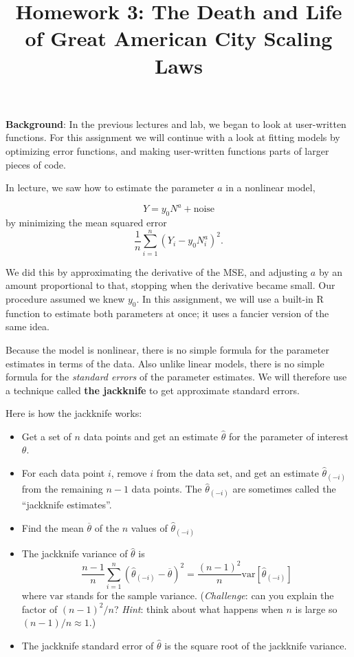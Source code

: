 \documentclass[
]{article}
\title{Homework 3: The Death and Life of Great American City Scaling Laws}
\author{}
\date{\vspace{-2.5em}}
\providecommand{\tightlist}{%
  \setlength{\itemsep}{0pt}\setlength{\parskip}{0pt}}
\begin{document}
\maketitle

\textbf{Background}: In the previous lectures and lab, we began to look
at user-written functions. For this assignment we will continue with a
look at fitting models by optimizing error functions, and making
user-written functions parts of larger pieces of code.

In lecture, we saw how to estimate the parameter \(a\) in a nonlinear
model,

\[
 Y = y_0 N^a + \mathrm{noise}
\] by minimizing the mean squared error \[
 \frac{1}{n}\sum_{i=1}^{n}{(Y_i - y_0 N_i^a)^2}.
\]

We did this by approximating the derivative of the MSE, and adjusting
\(a\) by an amount proportional to that, stopping when the derivative
became small. Our procedure assumed we knew \(y_0\). In this assignment,
we will use a built-in R function to estimate both parameters at once;
it uses a fancier version of the same idea.

Because the model is nonlinear, there is no simple formula for the
parameter estimates in terms of the data. Also unlike linear models,
there is no simple formula for the \emph{standard errors} of the
parameter estimates. We will therefore use a technique called
\textbf{the jackknife} to get approximate standard errors.

Here is how the jackknife works:

\begin{itemize}
\tightlist
\item
  Get a set of \(n\) data points and get an estimate \(\hat{\theta}\)
  for the parameter of interest \(\theta\).
\item
  For each data point \(i\), remove \(i\) from the data set, and get an
  estimate \(\hat{\theta}_{(-i)}\) from the remaining \(n-1\) data
  points. The \(\hat{\theta}_{(-i)}\) are sometimes called the
  ``jackknife estimates''.
\item
  Find the mean \(\overline{\theta}\) of the \(n\) values of
  \(\hat{\theta}_{(-i)}\)
\item
  The jackknife variance of \(\hat{\theta}\) is \[
  \frac{n-1}{n}\sum_{i=1}^{n}{(\hat{\theta}_{(-i)} - \overline{\theta})^2} = \frac{(n-1)^2}{n}\mathrm{var}{[\hat{\theta}_{(-i)}]}
  \] where \(\mathrm{var}\) stands for the sample variance.
  (\emph{Challenge}: can you explain the factor of \((n-1)^2/n\)?
  \emph{Hint}: think about what happens when \(n\) is large so
  \((n-1)/n \approx 1\).)
\item
  The jackknife standard error of \(\hat{\theta}\) is the square root of
  the jackknife variance.
\end{itemize}
\end{document}
